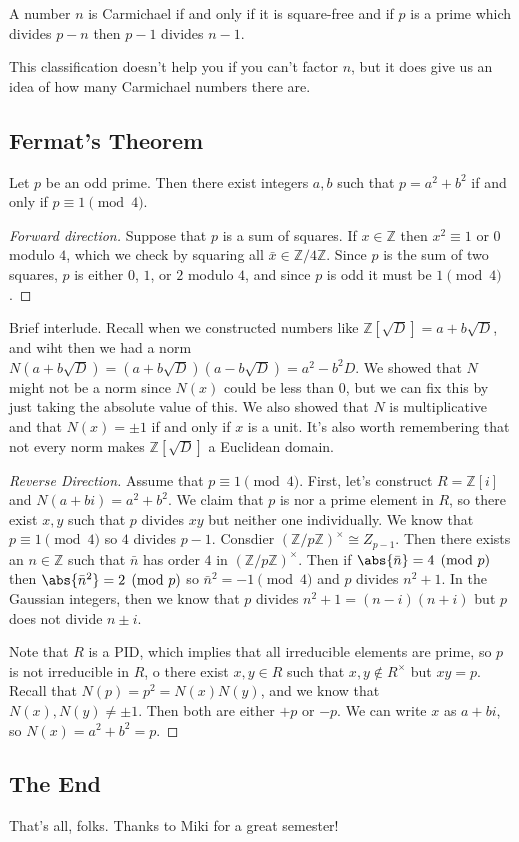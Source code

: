 \begin{theorem}
A number $n$ is Carmichael if and only if it is square-free and if $p$ is a prime which divides $p-n$ then $p-1$ divides $n-1$.
\end{theorem}

This classification doesn't help you if you can't factor $n$, but it does give us an idea of how many Carmichael numbers there are.

\subsection{Fermat's Theorem}

\begin{theorem}
Let $p$ be an odd prime. Then there exist integers $a,b$ such that $p = a^2 + b^2$ if and only if $p \equiv 1 \pmod{4}$.
\end{theorem}

\begin{proof}[Forward direction]
Suppose that $p$ is a sum of squares. If $x \in \mathbb{Z}$ then $x^2 \equiv 1$ or $0$ modulo $4$, which we check by squaring all $\bar{x} \in \mathbb{Z}/4\mathbb{Z}$. Since $p$ is the sum of two squares, $p$ is either $0$, $1$, or $2$ modulo $4$, and since $p$ is odd it must be $1 \pmod{4}$.
\end{proof}

Brief interlude. Recall when we constructed numbers like $\mathbb{Z}[\sqrt{D}] = a + b\sqrt{D}$, and wiht then we had a norm $N(a + b\sqrt{D}) = (a + b\sqrt{D})(a - b\sqrt{D}) = a^2-b^2D$. We showed that $N$ might not be a norm since $N(x)$ could be less than $0$, but we can fix this by just taking the absolute value of this. We also showed that $N$ is multiplicative and that $N(x) = \pm 1$ if and only if $x$ is a unit. It's also worth remembering that not every norm makes $\mathbb{Z}[\sqrt{D}]$ a Euclidean domain.

\begin{proof}[Reverse Direction]
Assume that $p \equiv 1 \pmod{4}$. First, let's construct $R = \mathbb{Z}[i]$ and $N(a+bi) = a^2 + b^2$. We claim that $p$ is nor a prime element in $R$, so there exist $x,y$ such that $p$ divides $xy$ but neither one individually. We know that $p \equiv 1 \pmod{4}$ so $4$ divides $p-1$. Consdier $(\mathbb{Z}/p\mathbb{Z})^\times \cong Z_{p-1}$. Then there exists an $n \in \mathbb{Z}$ such that $\bar{n}$ has order $4$ in $(\mathbb{Z}/p\mathbb{Z})^\times$. Then if $\abs{\bar{n}} = 4 \pmod{p}$ then $\abs{\bar{n}^2} = 2 \pmod{p}$ so $\bar{n}^2 = -1 \pmod{4}$ and $p$ divides $n^2 + 1$. In the Gaussian integers, then we know that $p$ divides $n^2 + 1 = (n-i)(n+i)$ but $p$ does not divide $n \pm i$.

Note that $R$ is a PID, which implies that all irreducible elements are prime, so $p$ is not irreducible in $R$, o there exist $x,y \in R$ such that $x,y \notin R^\times$ but $xy = p$. Recall that $N(p) = p^2 = N(x)N(y)$, and we know that $N(x),N(y) \not= \pm 1$. Then both are either $+p$ or $-p$. We can write $x$ as $a+bi$, so $N(x) = a^2 + b^2 = p$.
\end{proof}

\subsection{The End}

That's all, folks. Thanks to Miki for a great semester!